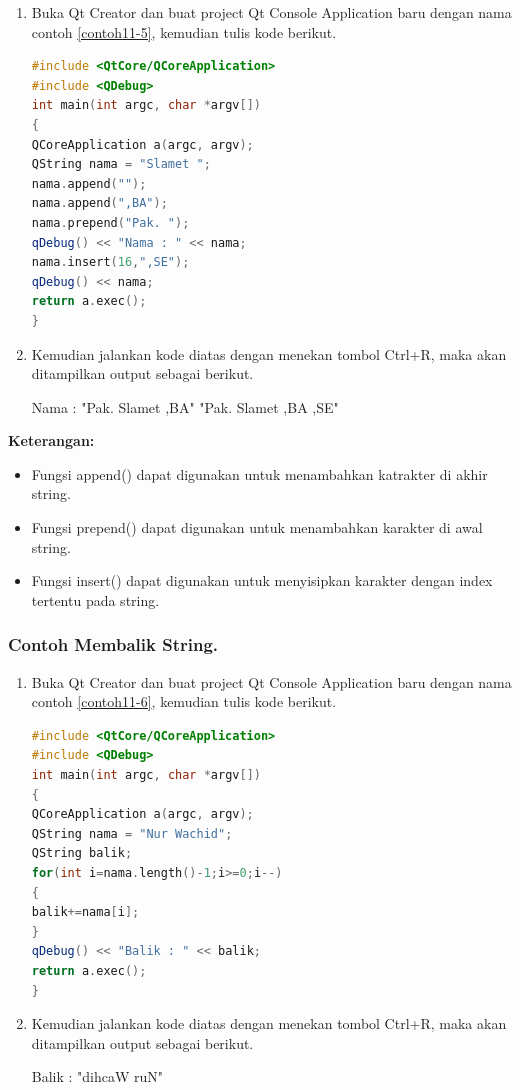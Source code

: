 \begin{enumerate}

\item
  Buka Qt Creator dan buat project Qt Console Application baru dengan
  nama contoh \ref{contoh11-5}, kemudian tulis kode berikut.

\begin{lstlisting}[language=c++, caption= Menggabungkan String, label=contoh11-5]
#include <QtCore/QCoreApplication>
#include <QDebug>
int main(int argc, char *argv[])
{
QCoreApplication a(argc, argv);
QString nama = "Slamet ";
nama.append("");
nama.append(",BA");
nama.prepend("Pak. ");
qDebug() << "Nama : " << nama;
nama.insert(16,",SE");
qDebug() << nama;
return a.exec();
}
\end{lstlisting}
\item
  Kemudian jalankan kode diatas dengan menekan tombol Ctrl+R, maka akan
  ditampilkan output sebagai berikut.
  
  \begin{lcverbatim}
Nama :  "Pak. Slamet ,BA"
"Pak. Slamet ,BA ,SE"
  \end{lcverbatim}
\end{enumerate}

\textbf{Keterangan:}

\begin{itemize}

\item
  Fungsi append() dapat digunakan untuk menambahkan katrakter di akhir
  string.
\item
  Fungsi prepend() dapat digunakan untuk menambahkan karakter di awal
  string.
\item
  Fungsi insert() dapat digunakan untuk menyisipkan karakter dengan
  index tertentu pada string.
\end{itemize}

\subsubsection*{Contoh  Membalik String.}

\begin{enumerate}

\item
  Buka Qt Creator dan buat project Qt Console Application baru dengan
  nama contoh \ref{contoh11-6}, kemudian tulis kode berikut.

\begin{lstlisting}[language=c++, caption= Membalik String, label=contoh11-6]
#include <QtCore/QCoreApplication>
#include <QDebug>
int main(int argc, char *argv[])
{
QCoreApplication a(argc, argv);
QString nama = "Nur Wachid";
QString balik;
for(int i=nama.length()-1;i>=0;i--)
{
balik+=nama[i];
}
qDebug() << "Balik : " << balik;
return a.exec();
}
\end{lstlisting}
\item
  Kemudian jalankan kode diatas dengan menekan tombol Ctrl+R, maka akan
  ditampilkan output sebagai berikut.

  \begin{lcverbatim}
Balik :  "dihcaW ruN"
  \end{lcverbatim}
\end{enumerate}

